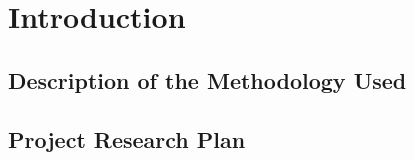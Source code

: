 \chapter{Introduction}
\label{chapter:introduction}



\newpage


\newpage


\newpage
\section{Description of the Methodology Used}

\newpage
\section{Project Research Plan}